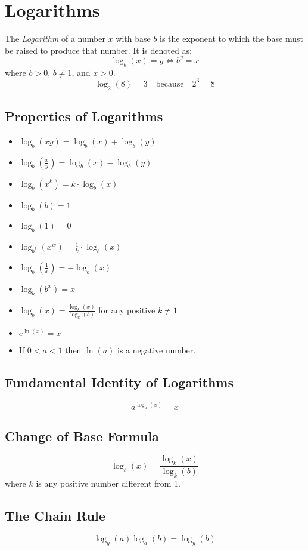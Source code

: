 \newpage
\section{Logarithms}

The \emph{Logarithm} of a number \(x\) 
with base \(b\) is the exponent to which the base must be raised to produce that number. It is denoted as:
  \[
    \log_b(x) = y \iff b^y = x
  \]
where \(b > 0\), \(b \neq 1\), and \(x > 0\).
  \[
    \log_2(8) = 3 \quad \text{because} \quad 2^3 = 8
  \]


\subsection{Properties of Logarithms}
\begin{itemize}[label=\(-\)]
  \item \(\log_b(xy) = \log_b(x) + \log_b(y)\)
  \item \(\log_b\left(\frac{x}{y}\right) = \log_b(x) - \log_b(y)\)
  \item \(\log_b(x^k) = k \cdot \log_b(x)\)
  \item \(\log_b(b) = 1\)
  \item \(\log_b(1) = 0\)
  \item \(\log_{b^k}(x^w) = \frac{1}{k} \cdot \log_b(x)\)
  \item \(\log_b\left(\frac{1}{x}\right) = -\log_b(x)\)
  \item \(\log_b(b^x) = x\)
  \item \(\log_b(x) = \frac{\log_k(x)}{\log_k(b)}\) for any positive \(k \neq 1\)
  \item \(e^{\ln(x)} = x\)
  \item If \(0 < a < 1\) then \(\ln(a)\) is a negative number. 
\end{itemize}

\subsection{Fundamental Identity of Logarithms}
\[
a^{\log_a(x)} = x
\]

\subsection{Change of Base Formula}
\[
\log_b(x) = \frac{\log_k(x)}{\log_k(b)}
\]
where \(k\) is any positive number different from 1.

\subsection{The Chain Rule}
\[
    \log_y(a) \log_a(b) = \log_y(b)
\]

